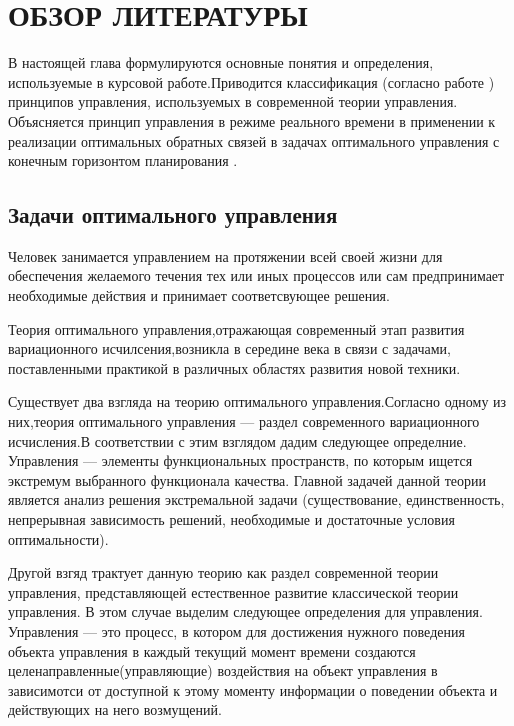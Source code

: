 \chapter{ОБЗОР ЛИТЕРАТУРЫ}\label{chap1}


В настоящей глава формулируются основные понятия и определения, используемые в курсовой работе.Приводится классификация (согласно работе \cite{GabasovKirillovaPU}) принципов управления, используемых в современной теории управления. Объясняется принцип управления в режиме реального времени в применении к реализации оптимальных обратных связей в задачах оптимального управления с конечным горизонтом планирования \cite{GabasovDmitrukKirillova15a}.


\section{Задачи оптимального управления}\label{1sec:optimal-control}
Человек занимается управлением на протяжении всей своей жизни для обеспечения желаемого течения тех или иных процессов или сам предпринимает необходимые действия и принимает соответсвующее решения.

Теория оптимального управления,отражающая современный этап развития вариационного исчилсения,возникла в середине  века в связи с задачами, поставленными практикой в различных областях развития новой техники.

Существует два взгляда на теорию оптимального управления.Согласно одному из них,теория оптимального управления — раздел современного вариационного исчисления.В соответствии с этим взглядом дадим следующее определние.
Управления — элементы функциональных пространств, по которым ищется экстремум выбранного функционала качества.
Главной задачей данной теории является анализ решения экстремальной задачи (существование, единственность, непрерывная зависимость решений, необходимые и достаточные условия оптимальности).

Другой взгяд трактует данную теорию как раздел современной теории управления, представляющей естественное развитие классической теории управления.
В этом случае выделим следующее определения для управления.
 Управления — это процесс, в котором для достижения нужного поведения объекта управления в каждый текущий момент времени создаются целенаправленные(управляющие) воздействия на объект управления в зависимотси от доступной к этому моменту информации о поведении объекта и действующих на него возмущений.


